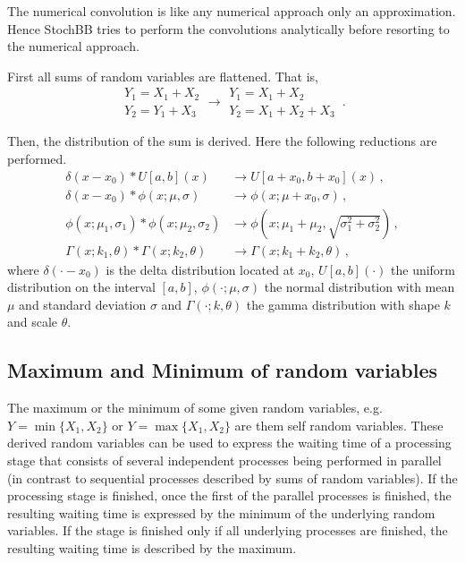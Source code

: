 \documentclass[a4paper, 10pt]{paper}
\begin{document}
The numerical convolution is like any numerical approach only an approximation. Hence StochBB tries to perform
the convolutions analytically before resorting to the numerical approach. 

First all sums of random variables are flattened. That is, 
\begin{equation}
 \begin{array}{l}
  Y_1 = X_1 + X_2\\
  Y_2 = Y_1 + X_3 
 \end{array} \longrightarrow 
 \begin{array}{l}
  Y_1 = X_1 + X_2\\
  Y_2 = X_1 + X_2 + X_3 
 \end{array}\,. \nonumber
\end{equation}

Then, the distribution of the sum is derived. Here the following reductions are performed.
\begin{align}
 \delta(x-x_0)\ast U[a,b](x) &\longrightarrow U[a+x_0,b+x_0](x)\,, \nonumber \\
 \delta(x-x_0)\ast \phi(x; \mu, \sigma) &\longrightarrow \phi(x; \mu+x_0, \sigma)\,, \nonumber \\
 \phi(x; \mu_1, \sigma_1)\ast \phi(x; \mu_2, \sigma_2) &\longrightarrow 
   \phi(x; \mu_1+\mu_2, \sqrt{\sigma_1^2+\sigma_2^2}) \nonumber\,, \\
 \Gamma(x; k_1, \theta)\ast \Gamma(x; k_2, \theta) &\longrightarrow 
   \Gamma(x; k_1+k_2, \theta)\,, \nonumber
\end{align}
where $\delta(\cdot-x_0)$ is the delta distribution located at $x_0$, $U[a,b](\cdot)$ the uniform
distribution on the interval $[a,b]$, $\phi(\cdot; \mu, \sigma)$ the normal distribution with mean 
$\mu$ and standard deviation $\sigma$ and $\Gamma(\cdot; k, \theta)$ the gamma distribution with
shape $k$ and scale $\theta$.

\subsection{Maximum and Minimum of random variables}
The maximum or the minimum of some given random variables, e.g. $Y=\min\{X_1,X_2\}$ or 
$Y=\max\{X_1,X_2\}$ are them self random variables. These derived random variables can be used to
express the waiting time of a processing stage that consists of several independent processes being
performed in parallel (in contrast to sequential processes described by sums of random variables). 
If the processing stage is finished, once the first of the parallel processes is finished, the 
resulting waiting time is expressed by the minimum of the underlying random variables. If the stage
is finished only if all underlying processes are finished, the resulting waiting time is described
by the maximum. 
\end{document}
